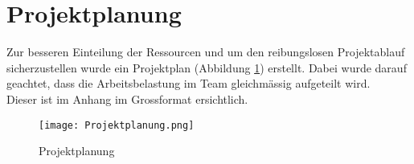 \section{Projektplanung}

Zur besseren Einteilung der Ressourcen und um den reibungslosen Projektablauf sicherzustellen wurde ein Projektplan (Abbildung \ref{fig::Projektplanung}) erstellt. 
Dabei wurde darauf geachtet, dass die Arbeitsbelastung im Team gleichmässig aufgeteilt wird.\\
Dieser ist im Anhang im Grossformat ersichtlich.


\begin{figure}[h] 
\centering
\texttt{[image: Projektplanung.png]}%
\caption{Projektplanung}%
\label{fig::Projektplanung}%
\end{figure}